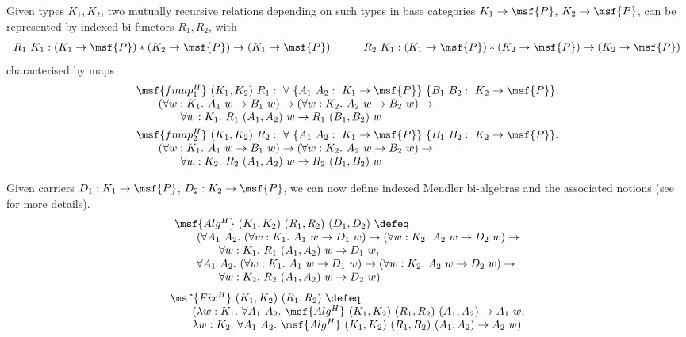\documentclass[submission,copyright,creativecommons]{eptcs}
\begin{document}
Given types $K_1, K_2$, two mutually recursive relations depending on
such types in base categories $K_1 \to \msf{P}$, $K_2 \to \msf{P}$,
can be represented by indexed bi-functors $R_1, R_2$, with
\begin{gather} 
\begin{array}{lll}
R_1 \ K_1: (K_1 \to \msf{P}) * (K_2 \to \msf{P}) \to (K_1 \to
\msf{P}) \qquad \quad  
R_2 \ K_1: (K_1 \to \msf{P}) * (K_2 \to \msf{P}) \to (K_2 \to \msf{P})
\end{array}
\end{gather} 
characterised by maps
\begin{gather}  
\begin{array}{lll}
\msf{fmap^H_1} \ (K_1, K_2) \ R_1: \ \forall \ \{ A_1 \ A_2 : \ K_1
\to \msf{P} \} \ \{B_1 \ B_2 : \ K_2 \to \msf{P} \}.  \\
\qquad (\forall w:K_1. \ A_1 \ w \to B_1 \ w) \to (\forall
w:K_2. \ A_2 \ w \to B_2 \ w) \to \\
\qquad \qquad 
\forall w:K_1. \ R_1 \ (A_1, A_2) \ w \to R_1 \ (B_1, B_2) \ w
\end{array} \\
\begin{array}{lll}
\msf{fmap^H_2} \ (K_1, K_2) \ R_2: \ \forall \ \{ A_1 \ A_2 : \ K_1
\to \msf{P} \} \ \{B_1 \ B_2 : \ K_2 \to \msf{P} \}.  \\
\qquad (\forall w:K_1. \ A_1 \ w \to B_1 \ w) \to (\forall
w:K_2. \ A_2 \ w \to B_2 \ w) \to \\
\qquad \qquad
 \forall w:K_2. \ R_2 \ (A_1, A_2) \ w \to R_2 \ (B_1, B_2) \ w
\end{array}
\end{gather} 

\noindent Given carriers $D_1: K_1 \to \msf{P}$, $D_2:K_2 \to
\msf{P}$, we can now define indexed Mendler bi-algebras and the
associated notions (see \cite{MACoq} for more details).
\begin{gather}  
\begin{array}{lll}
\msf{Alg^H} \ (K_1, K_2) \ (R_1, R_2) \ (D_1, D_2) \ \defeq \\
\qquad  ( \forall
A_1 \ A_2. \ (\forall w:K_1. \ A_1 \ w \to D_1 \ w) \to (\forall
w:K_2. \ A_2 \ w \to D_2 \ w) \to \\
\qquad \qquad 
 \forall w: K_1. \ R_1 \ (A_1, A_2)
\ w \to D_1 \ w,\\
\qquad \forall A_1
\ A_2. \ (\forall w:K_1. \ A_1 \ w \to D_1 \ w) \to (\forall
w:K_2. \ A_2 \ w \to D_2 \ w) \to \\
\qquad \qquad \forall w: K_2. \ R_2 \ (A_1, A_2)
\ w \to D_2 \ w )
\end{array}
\end{gather} 
\begin{gather}  
\begin{array}{lll}
\msf{Fix^H} \ (K_1, K_2) \ (R_1, R_2) \ \defeq \\
\qquad (\lambda w:K_1. \ \forall
A_1 \ A_2. \ \msf{Alg^H} \ (K_1,K_2) \ (R_1, R_2) \ (A_1, A_2) \to
A_1 \ w, \\
\qquad \lambda w:K_2. \ \forall A_1
\ A_2. \ \msf{Alg^H} \ (K_1,K_2) \ (R_1, R_2) \ (A_1, A_2) \to A_2
\ w)
\end{array}
\end{gather} 
\end{document}
